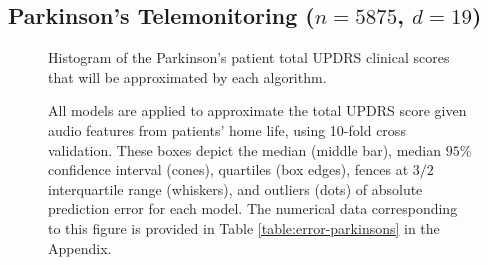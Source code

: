 \documentclass[smallextended,final]{svjour3}       %
\begin{document}
\subsection{Parkinson's Telemonitoring ($n = 5875$, $d = 19$)}

\begin{figure}
  \centering
  \caption{Histogram of the Parkinson's patient total UPDRS clinical
scores that will be approximated by each algorithm.}
  \label{fig:hist-parkinsons}
\end{figure}

\begin{figure}
  \centering
  \caption{All models are applied to approximate the total UPDRS score
  given audio features from patients' home life, using 10-fold cross
  validation.  These boxes depict the median (middle bar), median $95\%$
  confidence interval (cones), quartiles (box edges), fences at $3/2$
  interquartile range (whiskers), and outliers (dots) of absolute prediction
  error for each model. The numerical data corresponding to this figure
  is provided in Table \ref{table:error-parkinsons} in the Appendix.}
 \label{fig:error-parkinsons}
\end{figure}
\end{document}
